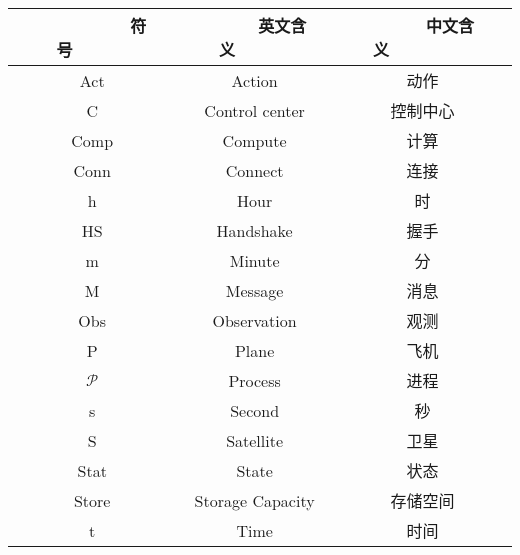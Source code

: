 \vspace{-2.5cm}
\chapter*{}

\renewcommand{\arraystretch}{1.2}
\begin{center}
\begin{tabular}{|c|c|c|}
	\hline
	\bfseries ~~~~~~~~~~符号~~~~~~ & \bfseries ~~~~~~英文含义~~~~~~ &\bfseries ~~~~~~中文含义~~~~~~~~~\\
	\hline
	Act & Action & 动作\\
	\hline
	C & Control center & 控制中心\\
	\hline
	Comp & Compute & 计算\\
	\hline
	Conn & Connect & 连接\\
	\hline
	h & Hour & 时\\
	\hline
	HS & Handshake & 握手\\
	\hline
	m & Minute & 分\\
	\hline
	M & Message & 消息\\
	\hline
	Obs & Observation & 观测\\
	\hline
	P & Plane & 飞机\\
	\hline
	$\mathcal{P}$ & Process & 进程\\
	\hline
	s & Second & 秒\\
	\hline
	S & Satellite & 卫星\\
	\hline
	Stat & State & 状态\\
	\hline
	Store & Storage Capacity & 存储空间\\
	\hline
	t & Time & 时间\\
	\hline	 
\end{tabular}
\end{center}